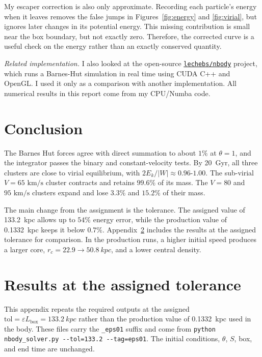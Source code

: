 \documentclass[12pt,a4paper]{article}
\newcommand{\abs}[1]{\left|#1\right|}
\begin{document}
My escaper correction is also only approximate. Recording each particle's energy
when it leaves removes the false jumps in Figures~\ref{fig:energy} and
\ref{fig:virial}, but ignores later changes in its potential energy. This
missing contribution is small near the box boundary, but not exactly zero.
Therefore, the corrected curve is a useful check on the energy rather than an
exactly conserved quantity.

\textit{Related implementation.} I also looked at the open-source
\href{https://github.com/lechebs/nbody}{\texttt{lechebs/nbody}} project, which
runs a Barnes-Hut simulation in real time using CUDA C++ and OpenGL. I used it
only as a comparison with another implementation. All numerical results in this
report come from my CPU/Numba code.

\FloatBarrier
\section{Conclusion}\label{sec:conclusion}

The Barnes Hut forces agree with direct summation to about $1\%$ at
$\theta=1$, and the integrator passes the binary and constant-velocity tests.
By \SI{20}{Gyr}, all three clusters are close to virial equilibrium, with
$2E_k/\abs{W}\approx0.96$-$1.00$. The sub-virial $V=65\text{ km/s}$ cluster
contracts and retains $99.6\%$ of its mass. The $V=80$ and $95\text{ km/s}$
clusters expand and lose $3.3\%$ and $15.2\%$ of their mass.

The main change from the assignment is the tolerance. The assigned value of
\SI{133.2}{kpc} allows up to $54\%$ energy error, while the production value of
\SI{0.1332}{kpc} keeps it below $0.7\%$. Appendix~\ref{sec:appendixeps}
includes the results at the assigned tolerance for comparison. In the production
runs, a higher initial speed produces a larger core,
$r_c=22.9\to\SI{50.8}{kpc}$, and a lower central density.

\appendix
\section{Results at the assigned tolerance}\label{sec:appendixeps}

This appendix repeats the required outputs at the assigned
$\mathrm{tol}=\varepsilon L_{\mathrm{box}}=\SI{133.2}{kpc}$ rather than the
production value of \SI{0.1332}{kpc} used in the body. These files carry the
\texttt{\_eps01} suffix and come from
    \texttt{python nbody\_solver.py -{}-tol=133.2 -{}-tag=eps01}.
The initial conditions, $\theta$, $S$, box, and end time are unchanged.
\end{document}
